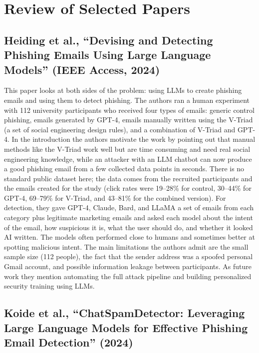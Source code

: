 \documentclass[10pt,a4paper]{article}
\begin{document}
\section{Review of Selected Papers}

\subsection{Heiding et al., ``Devising and Detecting Phishing Emails Using Large Language Models'' (IEEE Access, 2024)}

This paper looks at both sides of the problem: using LLMs to create phishing emails and using them to detect phishing. The authors ran a human experiment with 112 university participants who received four types of emails: generic control phishing, emails generated by GPT-4, emails manually written using the V-Triad (a set of social engineering design rules), and a combination of V-Triad and GPT-4. In the introduction the authors motivate the work by pointing out that manual methods like the V-Triad work well but are time consuming and need real social engineering knowledge, while an attacker with an LLM chatbot can now produce a good phishing email from a few collected data points in seconds. There is no standard public dataset here; the data comes from the recruited participants and the emails created for the study (click rates were 19--28\% for control, 30--44\% for GPT-4, 69--79\% for V-Triad, and 43--81\% for the combined version). For detection, they gave GPT-4, Claude, Bard, and LLaMA a set of emails from each category plus legitimate marketing emails and asked each model about the intent of the email, how suspicious it is, what the user should do, and whether it looked AI written. The models often performed close to humans and sometimes better at spotting malicious intent. The main limitations the authors admit are the small sample size (112 people), the fact that the sender address was a spoofed personal Gmail account, and possible information leakage between participants. As future work they mention automating the full attack pipeline and building personalized security training using LLMs.

\subsection{Koide et al., ``ChatSpamDetector: Leveraging Large Language Models for Effective Phishing Email Detection'' (2024)}
\end{document}

